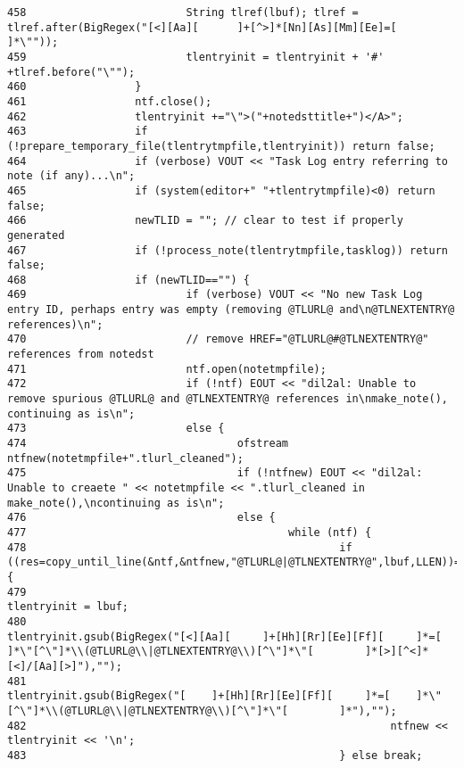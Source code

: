 \begin{verbatim}
458                         String tlref(lbuf); tlref = tlref.after(BigRegex("[<][Aa][      ]+[^>]*[Nn][As][Mm][Ee]=[       ]*\""));
459                         tlentryinit = tlentryinit + '#' +tlref.before("\"");
460                 }
461                 ntf.close();
462                 tlentryinit +="\">("+notedsttitle+")</A>";
463                 if (!prepare_temporary_file(tlentrytmpfile,tlentryinit)) return false;
464                 if (verbose) VOUT << "Task Log entry referring to note (if any)...\n";
465                 if (system(editor+" "+tlentrytmpfile)<0) return false;
466                 newTLID = ""; // clear to test if properly generated
467                 if (!process_note(tlentrytmpfile,tasklog)) return false;
468                 if (newTLID=="") {
469                         if (verbose) VOUT << "No new Task Log entry ID, perhaps entry was empty (removing @TLURL@ and\n@TLNEXTENTRY@ references)\n";
470                         // remove HREF="@TLURL@#@TLNEXTENTRY@" references from notedst
471                         ntf.open(notetmpfile);
472                         if (!ntf) EOUT << "dil2al: Unable to remove spurious @TLURL@ and @TLNEXTENTRY@ references in\nmake_note(), continuing as is\n";
473                         else {
474                                 ofstream ntfnew(notetmpfile+".tlurl_cleaned");
475                                 if (!ntfnew) EOUT << "dil2al: Unable to creaete " << notetmpfile << ".tlurl_cleaned in make_note(),\ncontinuing as is\n";
476                                 else {
477                                         while (ntf) {
478                                                 if ((res=copy_until_line(&ntf,&ntfnew,"@TLURL@|@TLNEXTENTRY@",lbuf,LLEN))==1) {
479                                                         tlentryinit = lbuf;
480                                                         tlentryinit.gsub(BigRegex("[<][Aa][     ]+[Hh][Rr][Ee][Ff][     ]*=[    ]*\"[^\"]*\\(@TLURL@\\|@TLNEXTENTRY@\\)[^\"]*\"[        ]*[>][^<]*[<]/[Aa][>]"),"");
481                                                         tlentryinit.gsub(BigRegex("[    ]+[Hh][Rr][Ee][Ff][     ]*=[    ]*\"[^\"]*\\(@TLURL@\\|@TLNEXTENTRY@\\)[^\"]*\"[        ]*"),"");
482                                                         ntfnew << tlentryinit << '\n';
483                                                 } else break;

\end{verbatim}

